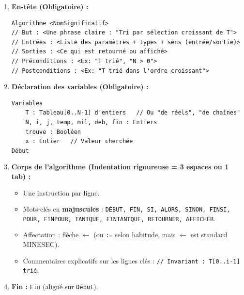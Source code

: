 \documentclass[11pt]{article}
\begin{document}
\begin{methode}
\begin{enumerate}
    \item \textbf{En-tête (Obligatoire) :}
    \begin{lstlisting}
Algorithme <NomSignificatif>
// But : <Une phrase claire : "Tri par sélection croissant de T">
// Entrées : <Liste des paramètres + types + sens (entrée/sortie)>
// Sorties : <Ce qui est retourné ou affiché>
// Préconditions : <Ex: "T trié", "N > 0">
// Postconditions : <Ex: "T trié dans l'ordre croissant">
    \end{lstlisting}
    \item \textbf{Déclaration des variables (Obligatoire) :}
    \begin{lstlisting}
Variables
    T : Tableau[0..N-1] d'entiers   // Ou "de réels", "de chaînes"
    N, i, j, temp, mil, deb, fin : Entiers
    trouve : Booléen
    x : Entier   // Valeur cherchée
Début
    \end{lstlisting}
    \item \textbf{Corps de l'algorithme (Indentation rigoureuse = 3 espaces ou 1 tab) :}
    \begin{itemize}
        \item Une instruction par ligne.
        \item Mots-clés en \textbf{majuscules} : \texttt{DÉBUT, FIN, SI, ALORS, SINON, FINSI, POUR, FINPOUR, TANTQUE, FINTANTQUE, RETOURNER, AFFICHER}.
        \item Affectation : flèche \texttt{$\leftarrow$} (ou \texttt{:=} selon habitude, mais $\leftarrow$ est standard MINESEC).
        \item Commentaires explicatifs sur les lignes clés : \texttt{// Invariant : T[0..i-1] trié}.
    \end{itemize}
    \item \textbf{Fin :} \texttt{Fin} (aligné sur \texttt{Début}).
\end{enumerate}
\end{methode}
\end{document}
